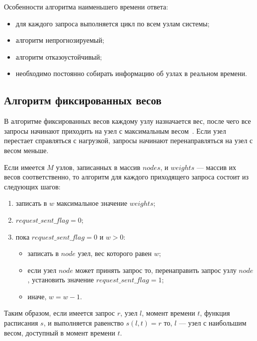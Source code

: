Особенности алгоритма наименьшего времени ответа:
\begin{itemize}
    \item для каждого запроса выполняется цикл по всем узлам системы;
	\item алгоритм непрогнозируемый; 
	\item алгоритм отказоустойчивый;
	\item необходимо постоянно собирать информацию об узлах в реальном времени.
\end{itemize}

\subsection{Алгоритм фиксированных весов}

В алгоритме фиксированных весов каждому узлу назначается вес, после чего все запросы начинают приходить на узел с максимальным весом~\cite{kemp}.
Если узел перестает справляться с нагрузкой, запросы начинают перенаправляться на узел с весом меньше.

Если имеется $M$ узлов, записанных в массив $nodes$, и $weights$ --- массив их весов соответственно, то алгоритм для каждого приходящего запроса состоит из следующих шагов:
\begin{enumerate}
	\item записать в $w$ максимальное значение $weights$;
	\item $request\_sent\_flag = 0$;
	\item пока $request\_sent\_flag = 0$ и $w > 0$:
	\begin{itemize}
		\item записать в $node$ узел, вес которого равен $w$;
		\item если узел $node$ может принять запрос то, перенаправить запрос узлу $node$, установить значение $request\_sent\_flag = 1$;
		\item иначе, $w = w - 1$.
	\end{itemize}
\end{enumerate}

Таким образом, если имеется запрос $r$, узел $l$, момент времени $t$, функция расписания $s$, и выполняется равенство $s(l, t) = r$ то, $l$ --- узел с наибольшим весом, доступный в момент времени $t$.

